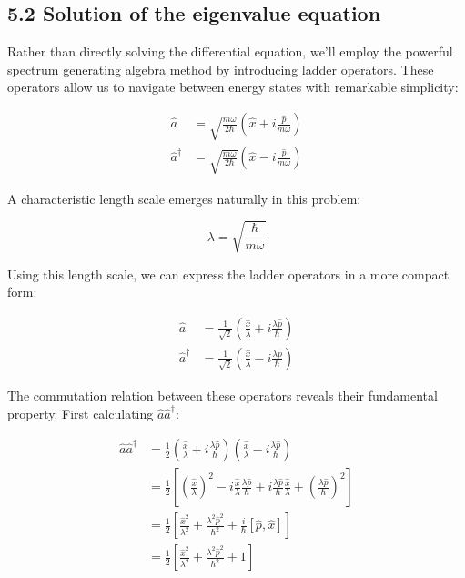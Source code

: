 \documentclass[italian]{HKNdocument}
\begin{document}
\subsection*{5.2 Solution of the eigenvalue equation}

Rather than directly solving the differential equation, we'll employ the powerful spectrum generating algebra method by introducing ladder operators. These operators allow us to navigate between energy states with remarkable simplicity:

\begin{align*}
\hat{a} &= \sqrt{\frac{m\omega}{2\hbar}}\left(\hat{x} + i\frac{\hat{p}}{m\omega}\right) \tag{5.5} \\
\hat{a}^\dagger &= \sqrt{\frac{m\omega}{2\hbar}}\left(\hat{x} - i\frac{\hat{p}}{m\omega}\right)
\end{align*}

A characteristic length scale emerges naturally in this problem:

\begin{equation*}
\lambda = \sqrt{\frac{\hbar}{m\omega}} \tag{5.6}
\end{equation*}

Using this length scale, we can express the ladder operators in a more compact form:

\begin{align*}
\hat{a} &= \frac{1}{\sqrt{2}}\left(\frac{\hat{x}}{\lambda} + i\frac{\lambda\hat{p}}{\hbar}\right) \tag{5.7} \\
\hat{a}^\dagger &= \frac{1}{\sqrt{2}}\left(\frac{\hat{x}}{\lambda} - i\frac{\lambda\hat{p}}{\hbar}\right)
\end{align*}

The commutation relation between these operators reveals their fundamental property. First calculating $\hat{a}\hat{a}^\dagger$:

\begin{align*}
\hat{a}\hat{a}^\dagger &= \frac{1}{2}\left(\frac{\hat{x}}{\lambda} + i\frac{\lambda\hat{p}}{\hbar}\right)\left(\frac{\hat{x}}{\lambda} - i\frac{\lambda\hat{p}}{\hbar}\right) \\
&= \frac{1}{2}\left[\left(\frac{\hat{x}}{\lambda}\right)^2 - i\frac{\hat{x}}{\lambda}\frac{\lambda\hat{p}}{\hbar} + i\frac{\lambda\hat{p}}{\hbar}\frac{\hat{x}}{\lambda} + \left(\frac{\lambda\hat{p}}{\hbar}\right)^2\right] \\
&= \frac{1}{2}\left[\frac{\hat{x}^2}{\lambda^2} + \frac{\lambda^2\hat{p}^2}{\hbar^2} + \frac{i}{\hbar}[\hat{p},\hat{x}]\right] \tag{5.8} \\
&= \frac{1}{2}\left[\frac{\hat{x}^2}{\lambda^2} + \frac{\lambda^2\hat{p}^2}{\hbar^2} + 1\right]
\end{align*}
\end{document}
